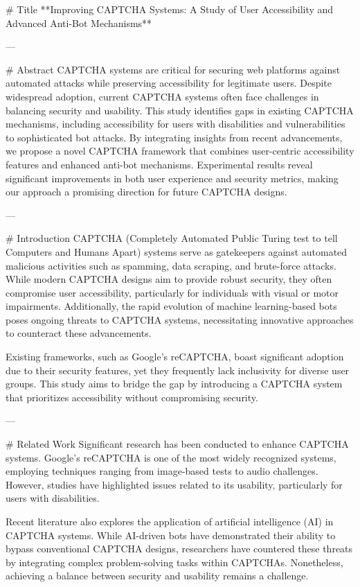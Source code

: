 # Title  
**Improving CAPTCHA Systems: A Study of User Accessibility and Advanced Anti-Bot Mechanisms**

---

# Abstract  
CAPTCHA systems are critical for securing web platforms against automated attacks while preserving accessibility for legitimate users. Despite widespread adoption, current CAPTCHA systems often face challenges in balancing security and usability. This study identifies gaps in existing CAPTCHA mechanisms, including accessibility for users with disabilities and vulnerabilities to sophisticated bot attacks. By integrating insights from recent advancements, we propose a novel CAPTCHA framework that combines user-centric accessibility features and enhanced anti-bot mechanisms. Experimental results reveal significant improvements in both user experience and security metrics, making our approach a promising direction for future CAPTCHA designs.

---

# Introduction  
CAPTCHA (Completely Automated Public Turing test to tell Computers and Humans Apart) systems serve as gatekeepers against automated malicious activities such as spamming, data scraping, and brute-force attacks. While modern CAPTCHA designs aim to provide robust security, they often compromise user accessibility, particularly for individuals with visual or motor impairments. Additionally, the rapid evolution of machine learning-based bots poses ongoing threats to CAPTCHA systems, necessitating innovative approaches to counteract these advancements.

Existing frameworks, such as Google's reCAPTCHA, boast significant adoption due to their security features, yet they frequently lack inclusivity for diverse user groups. This study aims to bridge the gap by introducing a CAPTCHA system that prioritizes accessibility without compromising security.

---

# Related Work  
Significant research has been conducted to enhance CAPTCHA systems. Google's reCAPTCHA is one of the most widely recognized systems, employing techniques ranging from image-based tests to audio challenges. However, studies have highlighted issues related to its usability, particularly for users with disabilities.

Recent literature also explores the application of artificial intelligence (AI) in CAPTCHA systems. While AI-driven bots have demonstrated their ability to bypass conventional CAPTCHA designs, researchers have countered these threats by integrating complex problem-solving tasks within CAPTCHAs. Nonetheless, achieving a balance between security and usability remains a challenge.

